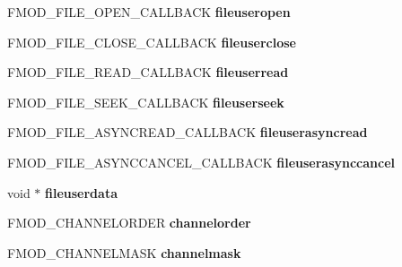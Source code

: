 \begin{DoxyCompactItemize}
F\+M\+O\+D\+\_\+\+F\+I\+L\+E\+\_\+\+O\+P\+E\+N\+\_\+\+C\+A\+L\+L\+B\+A\+CK {\bfseries fileuseropen}
\item 
\mbox{\label{structFMOD__CREATESOUNDEXINFO_a2fd60128c6052048b18d512f19804d4f}} 
F\+M\+O\+D\+\_\+\+F\+I\+L\+E\+\_\+\+C\+L\+O\+S\+E\+\_\+\+C\+A\+L\+L\+B\+A\+CK {\bfseries fileuserclose}
\item 
\mbox{\label{structFMOD__CREATESOUNDEXINFO_a6745a9a2e02fd099a706a889f07c9196}} 
F\+M\+O\+D\+\_\+\+F\+I\+L\+E\+\_\+\+R\+E\+A\+D\+\_\+\+C\+A\+L\+L\+B\+A\+CK {\bfseries fileuserread}
\item 
\mbox{\label{structFMOD__CREATESOUNDEXINFO_a9b9037a9d82085cf3517501953e4b1b3}} 
F\+M\+O\+D\+\_\+\+F\+I\+L\+E\+\_\+\+S\+E\+E\+K\+\_\+\+C\+A\+L\+L\+B\+A\+CK {\bfseries fileuserseek}
\item 
\mbox{\label{structFMOD__CREATESOUNDEXINFO_aef0eda031d70b37191b78a76c423f6d8}} 
F\+M\+O\+D\+\_\+\+F\+I\+L\+E\+\_\+\+A\+S\+Y\+N\+C\+R\+E\+A\+D\+\_\+\+C\+A\+L\+L\+B\+A\+CK {\bfseries fileuserasyncread}
\item 
\mbox{\label{structFMOD__CREATESOUNDEXINFO_a05d88d38bdefb9ec1e37b5a61e9cf149}} 
F\+M\+O\+D\+\_\+\+F\+I\+L\+E\+\_\+\+A\+S\+Y\+N\+C\+C\+A\+N\+C\+E\+L\+\_\+\+C\+A\+L\+L\+B\+A\+CK {\bfseries fileuserasynccancel}
\item 
\mbox{\label{structFMOD__CREATESOUNDEXINFO_a55e0c284a42bc714be64c7f965ab99c4}} 
void $\ast$ {\bfseries fileuserdata}
\item 
\mbox{\label{structFMOD__CREATESOUNDEXINFO_a29b8d2f1c167eca767fd9ecea44040f2}} 
F\+M\+O\+D\+\_\+\+C\+H\+A\+N\+N\+E\+L\+O\+R\+D\+ER {\bfseries channelorder}
\item 
\mbox{\label{structFMOD__CREATESOUNDEXINFO_a132dbe42a3282207c8d83032ce39870f}} 
F\+M\+O\+D\+\_\+\+C\+H\+A\+N\+N\+E\+L\+M\+A\+SK {\bfseries channelmask}
\item 
\mbox{\label{structFMOD__CREATESOUNDEXINFO_a58fdf5de9dca7e42f5586d157d7453db}} 

\end{DoxyCompactItemize}
